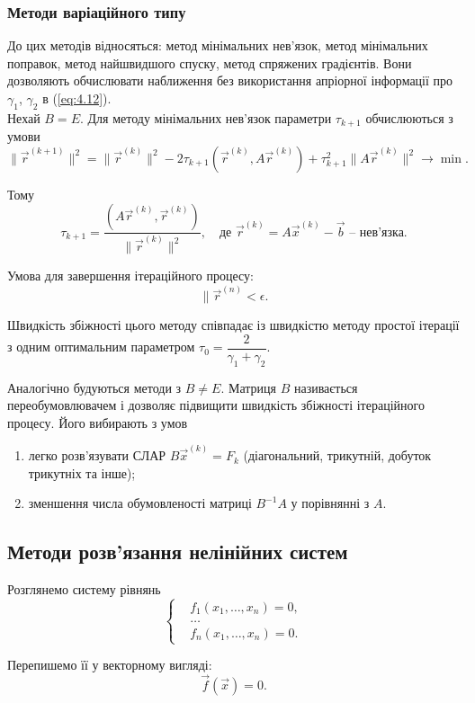 \subsubsection{Методи варіаційного типу}

До цих методів відносяться: метод мінімальних нев’язок, метод мінімальних поправок, метод найшвидшого спуску, метод спряжених градієнтів. Вони дозволяють обчислювати наближення без використання апріорної інформації про $\gamma_1$, $\gamma_2$ в (\ref{eq:4.12}). \\

Нехай $B = E$. Для методу мінімальних нев’язок параметри $\tau_{k+1}$ обчислюються з умови \[ \|\vec r^{(k+1)}\|^2 = \|\vec r^{(k)}\|^2 - 2\tau_{k+1}(\vec r^{(k)}, A\vec r^{(k)}) + \tau_{k+1}^2 \|A\vec r^{(k)}\|^2 \to \min. \]

Тому \[ \tau_{k+1} = \dfrac{(A\vec r^{(k)}, \vec r^{(k)}) }{\|\vec r^{(k)}\|^2}, \quad \text{де } \vec r^{(k)} = A \vec x^{(k)} - \vec b\text{ -- нев'язка}.\]

Умова для завершення ітераційного процесу: \[ \|\vec r^{(n)} < \epsilon.\]

Швидкість збіжності цього методу співпадає із швидкістю методу простої ітерації з одним оптимальним параметром $\tau_0 = \dfrac{2}{\gamma_1+\gamma_2}$.

Аналогічно будуються методи з $B \ne E$. Матриця $B$ називається переобумовлювачем і дозволяє підвищити швидкість збіжності ітераційного процесу. Його вибирають з умов 
\begin{enumerate}
	\item легко розв’язувати СЛАР $B \vec x^{(k)} = F_k$ (діагональний, трикутній, добуток трикутніх та інше); 
	\item зменшення числа обумовленості матриці $B^{-1}A$ у порівнянні з $A$.
\end{enumerate}

\subsection{Методи розв’язання нелінійних систем}

Розглянемо систему рівнянь
\[ \left\{ \begin{aligned} & f_1(x_1, \ldots, x_n) = 0, \\ & \ldots \\ & f_n(x_1,\ldots,x_n) = 0. \end{aligned} \right. \]

Перепишемо її у векторному вигляді: 
\begin{equation}
	\label{eq:4.13}
	\vec f(\vec x) = 0.
\end{equation}

